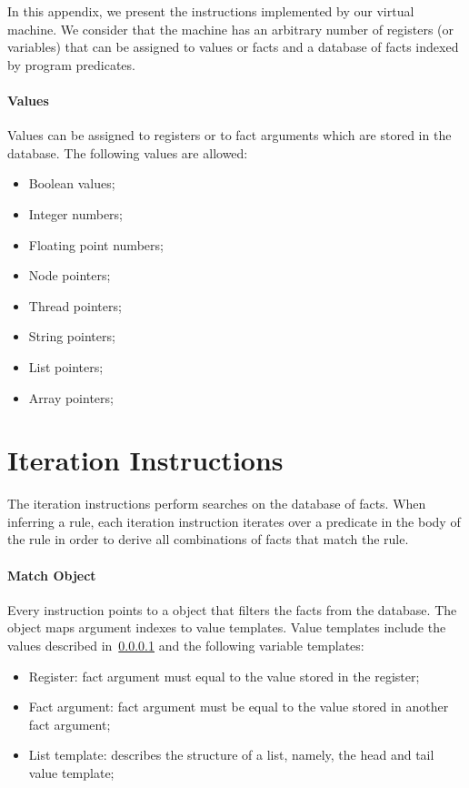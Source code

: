 In this appendix, we present the instructions implemented by our virtual
machine. We consider that the machine has an arbitrary number of registers (or
variables) that can be assigned to values or facts and a database of facts
indexed by program predicates.

\paragraph{Values}\label{appendix:vm:values} Values can be assigned to registers or to fact arguments
which are stored in the database. The following values are allowed:

\begin{itemize}
      \item Boolean values;
      \item Integer numbers;
      \item Floating point numbers;
      \item Node pointers;
      \item Thread pointers;
      \item String pointers;
      \item List pointers;
      \item Array pointers;
\end{itemize}

\section{Iteration Instructions}

The iteration instructions perform searches on the database of facts. When
inferring a rule, each iteration instruction iterates over a predicate in the
body of the rule in order to derive all combinations of facts that match the
rule.

\paragraph{Match Object} Every instruction points to a  object that
filters the facts from the database. The object maps argument indexes to value
templates. Value templates include the values described
in~\ref{appendix:vm:values} and the following variable templates:

\begin{itemize}
      \item Register: fact argument must equal to the value stored in the
         register;
      \item Fact argument: fact argument must be equal to the value stored in
         another fact argument;
      \item List template: describes the structure of a list, namely, the head
         and tail value template;
\end{itemize}

